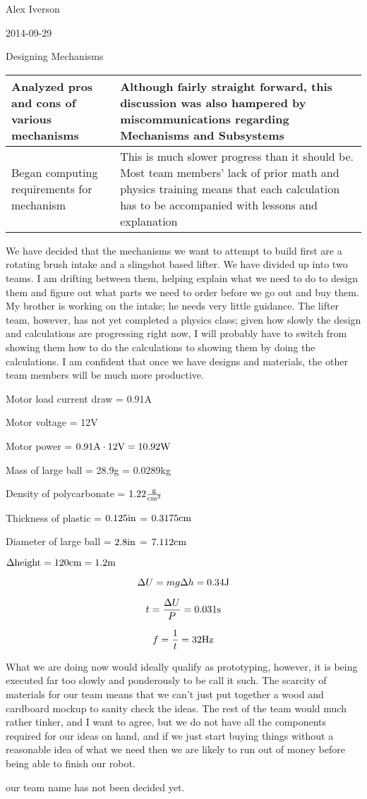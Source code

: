 Alex Iverson

2014-09-29

Designing Mechanisms

\begin{tabular}{|p{5cm}|p{5cm}|}
 \hline
 Analyzed pros and cons of various mechanisms
 &
 Although fairly straight forward, this discussion was also hampered by miscommunications regarding Mechanisms and Subsystems
 \\
 \hline
 Began computing requirements for mechanism
 &
 This is much slower progress than it should be. Most team members’ lack of prior math and physics training means that each calculation has to be accompanied with lessons and explanation
 \\
 \hline
\end{tabular}

We have decided that the mechanisms we want to attempt to build first are a rotating brush intake and a slingshot based lifter. We have divided up into two teams. I am drifting between them, helping explain what we need to do to design them and figure out what parts we need to order before we go out and buy them. My brother is working on the intake; he needs very little guidance. The lifter team, however, has not yet completed a physics class; given how slowly the design and calculations are progressing right now, I will probably have to switch from showing them how to do the calculations to showing them by doing the calculations. I am confident that once we have designs and materials, the other team members will be much more productive. 

Motor load current draw = 0.91A

Motor voltage = 12V

Motor power = $0.91\rm{A}\cdot12\rm{V} = 10.92\rm{W}$

Mass of large ball = 28.9g = 0.0289kg

Density of polycarbonate = $1.22\frac{\rm{g}}{\rm{cm}^3}$

Thickness of plastic = $0.125\rm{in}$ = $0.3175\rm{cm}$

Diameter of large ball = $2.8\rm{in}$ = $7.112\rm{cm}$

$\Delta \rm{height} = 120\rm{cm} = 1.2\rm{m}$

\[\Delta U = m g \Delta h = 0.34\rm{J}\]

\[t = \frac{\Delta U}{P} = 0.031\rm{s}\]

\[f = \frac{1}{t} = 32\rm{Hz}\]

\medskip

What we are doing now would ideally qualify as prototyping, however, it is being executed far too slowly and ponderously to be call it such. The scarcity of materials for our team means that we can’t just put together a wood and cardboard mockup to sanity check the ideas. The rest of the team would much rather tinker, and I want to agree, but we do not have all the components required for our ideas on hand, and if we just start buying things without a reasonable idea of what we need then we are likely to run out of money before being able to finish our robot.

our team name has not been decided yet.